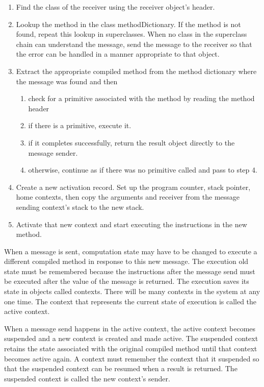 \documentclass[a4paper,10pt,twoside]{book}
\begin{document}
\begin{enumerate}
\item Find the class of the receiver using the receiver object's header.
\item Lookup the method in the class methodDictionary. If the method is not found, repeat this lookup in superclasses. When no class in the superclass chain can understand the message, send the message  to the receiver so that the error can be handled in a manner appropriate to that object.

\item Extract the appropriate compiled method from the method dictionary where the message was found and then
\begin{enumerate}
\item check for a primitive associated with the method by reading the method header
\item if there is a primitive, execute it.
\item if it completes successfully, return the result object directly to the message sender.
\item otherwise, continue as if there was no primitive called and pass to step 4.
\end{enumerate}
\item Create a new activation record. Set up the program counter, stack pointer,
home contexts, then copy the arguments and receiver from the message sending context's stack to the new stack.
\item Activate that new context and start executing the instructions in the new method.
\end{enumerate}

When a message is sent, computation state may have to be changed to execute a different compiled method in response to this new message. The execution old state must be remembered because the instructions after the message send must be executed after the value of the message is returned.
The execution saves its state in objects called contexts. There will be many contexts in the system at any one time. The context that represents the current state of execution is called the active context.

When a message send happens in the active context, the active context becomes suspended and a new context is created and made active. The suspended context retains the state associated with the original compiled method until that context becomes active again. A context must remember the context that it suspended so that the suspended context can be resumed when a result is returned. The suspended context is called the new context's sender.
\end{document}

